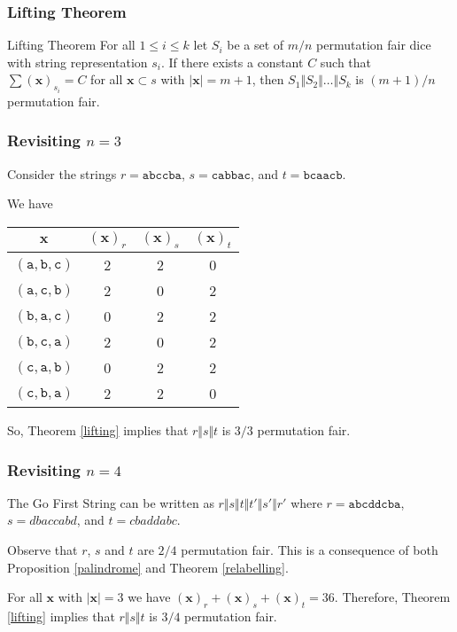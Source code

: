 \documentclass[aspectratio=169]{beamer}
\begin{document}
\begin{frame}[triangle=siiblue]
\frametitle{Lifting Theorem}
\begin{siitheorem}[label=lifting]{Lifting Theorem}{}
For all $1 \leq i \leq k$ let $S_i$ be a set of $m/n$ permutation fair dice with string representation $s_i$. If there exists a constant $C$ such that $\sum (\mathbf{x})_{s_i} = C$ for all $\mathbf{x} \subset s$ with $|\mathbf{x}| = m+1$, then $S_1 \Vert S_2 \Vert \ldots \Vert S_k$ is $(m+1)/n$ permutation fair.
\end{siitheorem}

\end{frame}
\begin{frame}[triangle=siiblue]
\frametitle{Revisiting $n=3$}
Consider the strings $r = \texttt{abccba}$, $s = \texttt{cabbac}$, and $t = \texttt{bcaacb}$.

\vfill

We have
\begin{table}
\begin{tabular}{c ccc} \toprule
$\mathbf{x}$ & $(\mathbf{x})_r$ & $(\mathbf{x})_s$ & $(\mathbf{x})_t$ \\ \midrule
$(\texttt{a}, \texttt{b}, \texttt{c})$ & 2 & 2 & 0 \\
$(\texttt{a}, \texttt{c}, \texttt{b})$ & 2 & 0 & 2 \\
$(\texttt{b}, \texttt{a}, \texttt{c})$ & 0 & 2 & 2 \\
$(\texttt{b}, \texttt{c}, \texttt{a})$ & 2 & 0 & 2 \\
$(\texttt{c}, \texttt{a}, \texttt{b})$ & 0 & 2 & 2 \\
$(\texttt{c}, \texttt{b}, \texttt{a})$ &  2 & 2 & 0 \\ \bottomrule
\end{tabular}
\end{table}

\vfill

So, Theorem \ref{lifting} implies that $r \Vert s \Vert t$ is $3/3$ permutation fair. 
\end{frame}

\begin{frame}[triangle=siiblue]
\frametitle{Revisiting $n=4$}
The Go First String can be written as $r \Vert s \Vert t \Vert t' \Vert s' \Vert r'$ where $r = \texttt{abcddcba}$,  $s = dbaccabd$, and  $t = cbaddabc$.

\vfill

Observe that $r$,  $s$ and $t$ are $2/4$ permutation fair. This is a consequence of both Proposition \ref{palindrome} and Theorem \ref{relabelling}.

\vfill

For all $\mathbf{x}$ with $|\mathbf{x}| = 3$ we have $(\mathbf{x})_r + (\mathbf{x})_s + (\mathbf{x})_t = 36$. Therefore, Theorem \ref{lifting} implies that $r \Vert s \Vert t$ is $3/4$ permutation fair.
\end{frame}
\end{document}
